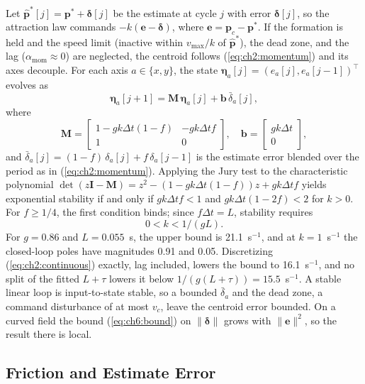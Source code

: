 Let $\hat{\mathbf{p}}^*[j] = \mathbf{p}^* + \boldsymbol{\delta}[j]$ be the estimate at cycle $j$ with error $\boldsymbol{\delta}[j]$, so the attraction law commands $-k(\mathbf{e} - \boldsymbol{\delta})$, where $\mathbf{e} = \mathbf{p}_c - \mathbf{p}^*$. If the formation is held and the speed limit (inactive within $v_{\max}/k$ of $\hat{\mathbf{p}}^*$), the dead zone, and the lag ($\alpha_{\text{mom}} \approx 0$) are neglected, the centroid follows (\ref{eq:ch2:momentum}) and its axes decouple. For each axis $a \in \{x, y\}$, the state $\boldsymbol{\eta}_a[j] = (e_a[j], e_a[j-1])^\top$ evolves as
\begin{equation}\label{eq:ch6:cl}
\boldsymbol{\eta}_a[j{+}1] = \mathbf{M}\,\boldsymbol{\eta}_a[j] + \mathbf{b}\,\bar{\delta}_a[j],
\end{equation}
where
\[
\mathbf{M} = \begin{bmatrix} 1-gk\Delta t(1-f) & -gk\Delta t f \\ 1 & 0 \end{bmatrix}, \quad \mathbf{b} = \begin{bmatrix} gk\Delta t \\ 0 \end{bmatrix},
\]
and $\bar{\delta}_a[j] = (1-f)\,\delta_a[j] + f\,\delta_a[j-1]$ is the estimate error blended over the period as in (\ref{eq:ch2:momentum}). Applying the Jury test to the characteristic polynomial $\det(z\mathbf{I} - \mathbf{M}) = z^2 - (1 - gk\Delta t(1-f))z + gk\Delta t f$ yields exponential stability if and only if $gk\Delta t f < 1$ and $gk\Delta t(1-2f) < 2$ for $k > 0$. For $f \ge 1/4$, the first condition binds; since $f\Delta t = L$, stability requires
\begin{equation}\label{eq:ch6:kmax}
0 < k < 1/(gL).
\end{equation}
For $g = 0.86$ and $L = 0.055$~s, the upper bound is 21.1~s$^{-1}$, and at $k = 1$~s$^{-1}$ the closed-loop poles have magnitudes 0.91 and 0.05. Discretizing (\ref{eq:ch2:continuous}) exactly, lag included, lowers the bound to 16.1~s$^{-1}$, and no split of the fitted $L+\tau$ lowers it below $1/(g(L+\tau)) = 15.5$~s$^{-1}$. A stable linear loop is input-to-state stable, so a bounded $\bar{\delta}_a$ and the dead zone, a command disturbance of at most $v_c$, leave the centroid error bounded. On a curved field the bound (\ref{eq:ch6:bound}) on $\|\boldsymbol{\delta}\|$ grows with $\|\mathbf{e}\|^2$, so the result there is local.

\subsection{Friction and Estimate Error}
\label{sec:ch6:friction}

